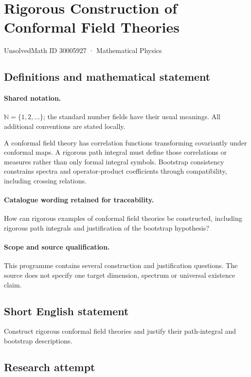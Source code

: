\documentclass[11pt]{article}
\begin{document}
\setcounter{section}{30005926}
\section{Rigorous Construction of Conformal Field Theories}\label{30005927}
{\small UnsolvedMath ID 30005927 · Mathematical Physics}
\subsection{Definitions and mathematical statement}

\paragraph{Shared notation.}$\mathbb N=\{1,2,\ldots\}$; the standard number fields have their usual meanings. All additional conventions are stated locally.


A conformal field theory has correlation functions transforming covariantly under conformal maps. A rigorous path integral must define those correlations or measures rather than only formal integral symbols. Bootstrap consistency constrains spectra and operator-product coefficients through compatibility, including crossing relations.

\paragraph{Catalogue wording retained for traceability.}
How can rigorous examples of conformal field theories be constructed, including rigorous path integrals and justification of the bootstrap hypothesis?

\paragraph{Scope and source qualification.}This programme contains several construction and justification questions. The source does not specify one target dimension, spectrum or universal existence claim.
\subsection{Short English statement}
Construct rigorous conformal field theories and justify their path-integral and bootstrap descriptions.
\subsection{Research attempt}
\end{document}
